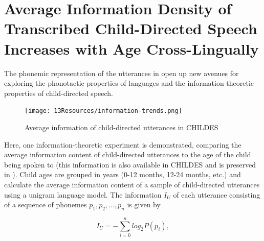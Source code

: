 \section{Average Information Density of Transcribed Child-Directed Speech Increases with Age Cross-Lingually}\label{app:parentese}


The phonemic representation of the utterances in \ipachildes open up new avenues for exploring the phonotactic properties of languages and the information-theoretic properties of child-directed speech. %


\begin{figure}
    \centering
    \texttt{[image: 13Resources/information-trends.png]}
    \caption{Average information of child-directed utterances in CHILDES}
    \label{fig:13-information-trends}
\end{figure}

Here, one information-theoretic experiment is demonstrated, comparing the average information content of child-directed utterances to the age of the child being spoken to (this information is also available in CHILDES and is preserved in \ipachildes). Child ages are grouped in years (0-12 months, 12-24 months, etc.) and calculate the average information content of a sample of child-directed utterances using a unigram language model. The information $I_U$ of each utterance consisting of a sequence of phonemes $p_1,p_2,\ldots,p_n$ is given by

$$I_U = -\sum_{i=0}^{n}{log_2P(p_i)},$$


